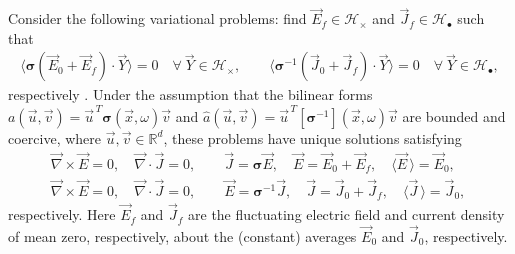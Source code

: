\documentclass[jmp,graphicx]{revtex4-1}
\begin{document}
Consider the following variational problems: 
find $\vec{E}_f\in\mathscr{H}_\times$ and  $\vec{J}_f\in \mathscr{H}_{\bullet}$ such
that    
%
\begin{align}
  \label{eq:Weak_Curl_Free_Variational_Form}
 \langle\bm{\sigma}(\vec{E}_0+\vec{E}_f)\cdot\vec{Y}\rangle=0 \quad  \forall \
  \vec{Y}\in\mathscr{H}_\times,\qquad
%
 \langle\bm{\sigma}^{-1}(\vec{J}_0+\vec{J}_f)\cdot\vec{Y}\rangle=0 \quad  \forall \
  \vec{Y}\in\mathscr{H}_{\bullet},  
\end{align}
%
respectively \cite{Golden:CMP-473}. Under the assumption that the
bilinear forms
$a(\vec{u},\vec{v})=\vec{u}^{\,T}\bm{\sigma}(\vec{x},\omega)\vec{v}$ and
$\hat{a}(\vec{u},\vec{v})=\vec{u}^{\,T}[\bm{\sigma}^{-1}](\vec{x},\omega)\vec{v}$
are bounded and coercive, where $\vec{u},\vec{v}\in\mathbb{R}^d$, these
problems have unique solutions satisfying \cite{Golden:CMP-473} 
%
\begin{align}
  \label{eq:Maxwells_Equations_E}  
  &\vec{\nabla}\times\vec{E}=0, \quad
  \vec{\nabla}\cdot\vec{J}=0,\qquad 
  \vec{J}=\bm{\sigma}\vec{E},\quad
  \vec{E}=\vec{E}_0+\vec{E}_f, \quad
  \langle\vec{E}\,\rangle=\vec{E}_0,\\
%
  \label{eq:Maxwells_Equations_D}
   &\vec{\nabla}\times\vec{E}=0, \quad
   \vec{\nabla}\cdot\vec{J}=0, \qquad
   \vec{E}=\bm{\sigma}^{-1}\vec{J},\quad   
   \vec{J}=\vec{J}_0+\vec{J}_f,\quad
   \langle\vec{J}\,\rangle=\vec{J}_0,\quad
\end{align}
%
respectively. Here $\vec{E}_f$ and $\vec{J}_f$ are the fluctuating
electric field and current density of mean zero, respectively, about the
(constant) averages $\vec{E}_0$ and $\vec{J}_0$, respectively. 
\end{document}
